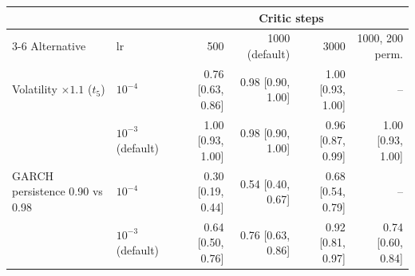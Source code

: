 \begin{tabular}{llrrrr}
\toprule
 &  & \multicolumn{4}{c}{Critic steps} \\
\cmidrule(lr){3-6}
Alternative & lr & 500 & 1000 (default) & 3000 & 1000, 200 perm. \\
\midrule
Volatility $\times1.1$ ($t_5$) & $10^{-4}$ & 0.76 [0.63, 0.86] & 0.98 [0.90, 1.00] & 1.00 [0.93, 1.00] & -- \\
 & $10^{-3}$ (default) & 1.00 [0.93, 1.00] & 0.98 [0.90, 1.00] & 0.96 [0.87, 0.99] & 1.00 [0.93, 1.00] \\
GARCH persistence 0.90 vs 0.98 & $10^{-4}$ & 0.30 [0.19, 0.44] & 0.54 [0.40, 0.67] & 0.68 [0.54, 0.79] & -- \\
 & $10^{-3}$ (default) & 0.64 [0.50, 0.76] & 0.76 [0.63, 0.86] & 0.92 [0.81, 0.97] & 0.74 [0.60, 0.84] \\
\bottomrule
\end{tabular}
